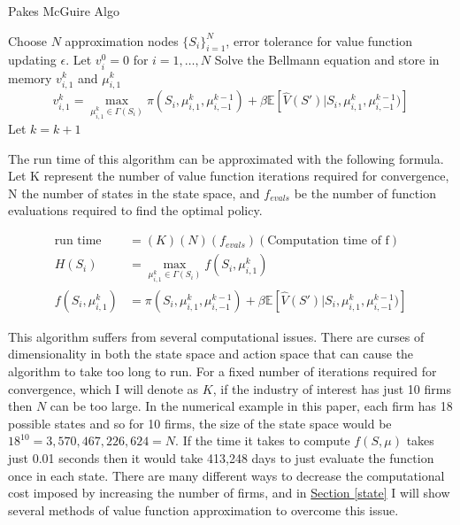 \documentclass[12pt]{article}
\newcommand{\norm}[1]{\left\lVert#1\right\rVert}
\begin{document}
\begin{algorithm}[H]
  \caption{Pakes McGuire Algo}
  \begin{algorithmic}[1]
    \Procedure{}{} Choose $N$ approximation nodes $\{S_i\}_{i=1}^N$, error tolerance for value function updating $\epsilon$.
    \State Let $v^0_i=0$ for $i=1,\dots,N$
    \While{$\norm{v^{k}_1-v^{k-1}_1} > \frac{\epsilon (1-\beta)}{2\beta}$}
    \State Solve the Bellmann equation and store in memory $v^k_{i,1}$ and $\mu^k_{i,1}$
    \begin{equation*}
      v^k_{i,1}=\max_{\mu^k_{i,1} \in \Gamma(S_i)} \pi(S_i, \mu^k_{i,1}, \mu^{k-1}_{i,-1})+ \beta\mathbb{E}[\hat{V}(S')|S_i,\mu^k_{i,1},\mu^{k-1}_{i,-1})]
    \end{equation*}
    \State Let $k=k+1$
    \EndFor
    \EndWhile
    \EndProcedure
  \end{algorithmic}
\end{algorithm}

The run time of this algorithm can be approximated with the following formula. Let K represent the number of value function iterations required for convergence, N the number of states in the state space, and $f_{evals}$ be the number of function evaluations required to find the optimal policy.

\begin{equation}
  \label{runtime}
  \begin{split}
  \text{run time} &= (K)(N)(f_{evals})(\text{Computation time of f})\\
  H(S_i)&=\max_{\mu^k_{i,1} \in \Gamma(S_i)}f(S_i,\mu^k_{i,1})\\
  f(S_i,\mu^k_{i,1})&=\pi(S_i, \mu^k_{i,1}, \mu^{k-1}_{i,-1})+ \beta\mathbb{E}[\hat{V}(S')|S_i,\mu^k_{i,1},\mu^{k-1}_{i,-1})]
  \end{split}
\end{equation}

This algorithm suffers from several computational issues. There are curses of dimensionality in both the state space and action space that can cause the algorithm to take too long to run. For a fixed number of iterations required for convergence, which I will denote as $K$, if the industry of interest has just 10 firms then $N$ can be too large. In the numerical example in this paper, each firm has 18 possible states and so for 10 firms, the size of the state space would be $18^{10}=3,570,467,226,624=N$. If the time it takes to compute $f(S,\mu)$ takes just 0.01 seconds then it would take 413,248 days to just evaluate the function once in each state. There are many different ways to decrease the computational cost imposed by increasing the number of firms, and in \hyperref[state]{Section \ref{state}} I will show several methods of value function approximation to overcome this issue.
\end{document}
